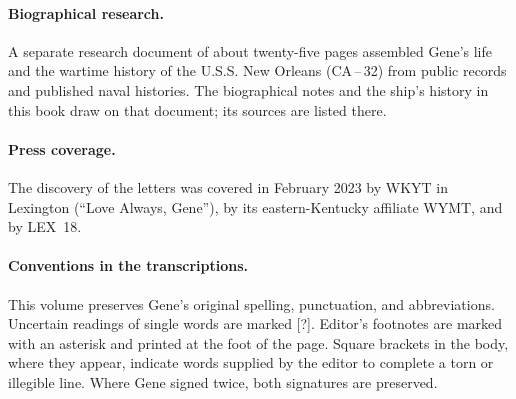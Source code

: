 \paragraph{Biographical research.}
A separate research document of about twenty-five pages assembled Gene's life
and the wartime history of the U.S.S. New Orleans (CA\,--\,32) from public
records and published naval histories. The biographical notes and the ship's
history in this book draw on that document; its sources are listed there.

\paragraph{Press coverage.}
The discovery of the letters was covered in February 2023 by WKYT in Lexington
(``Love Always, Gene''), by its eastern-Kentucky affiliate WYMT, and by LEX~18.

\paragraph{Conventions in the transcriptions.}
This volume preserves Gene's original spelling, punctuation, and
abbreviations. Uncertain readings of single words are marked
\textsc{[?]}. Editor's footnotes are marked with an asterisk and printed
at the foot of the page. Square brackets in the body, where they
appear, indicate words supplied by the editor to complete a torn or
illegible line. Where Gene signed twice, both signatures are
preserved.
\vfill
